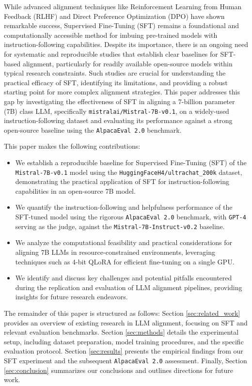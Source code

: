 \documentclass[11pt]{article}
\begin{document}
While advanced alignment techniques like Reinforcement Learning from Human Feedback (RLHF) and Direct Preference Optimization (DPO) have shown remarkable success, Supervised Fine-Tuning (SFT) remains a foundational and computationally accessible method for imbuing pre-trained models with instruction-following capabilities. Despite its importance, there is an ongoing need for systematic and reproducible studies that establish clear baselines for SFT-based alignment, particularly for readily available open-source models within typical research constraints. Such studies are crucial for understanding the practical efficacy of SFT, identifying its limitations, and providing a robust starting point for more complex alignment strategies. This paper addresses this gap by investigating the effectiveness of SFT in aligning a 7-billion parameter (7B) class LLM, specifically \texttt{mistralai/Mistral-7B-v0.1}, on a widely-used instruction-following dataset and evaluating its performance against a strong open-source baseline using the \texttt{AlpacaEval 2.0} benchmark.

This paper makes the following contributions:
\begin{itemize}
    \item We establish a reproducible baseline for Supervised Fine-Tuning (SFT) of the \texttt{Mistral-7B-v0.1} model using the \texttt{HuggingFaceH4/ultrachat\_200k} dataset, demonstrating the practical application of SFT for instruction-following capabilities in an open-source 7B model.
    \item We quantify the instruction-following and helpfulness performance of the SFT-tuned model using the rigorous \texttt{AlpacaEval 2.0} benchmark, with \texttt{GPT-4} serving as the judge, against the \texttt{Mistral-7B-Instruct-v0.2} baseline.
    \item We analyze the computational feasibility and practical considerations for aligning 7B LLMs in resource-constrained environments, leveraging techniques such as 4-bit QLoRA for efficient fine-tuning on a single GPU.
    \item We identify and discuss key challenges and potential pitfalls encountered during the replication and evaluation of LLM alignment pipelines, providing insights for future research endeavors.
\end{itemize}

The remainder of this paper is structured as follows: Section \ref{sec:related_work} provides an overview of existing research in LLM alignment, focusing on SFT and relevant evaluation benchmarks. Section \ref{sec:methods} details the experimental setup, including dataset preparation, model training procedures, and the specific evaluation protocol. Section \ref{sec:results} presents the empirical findings from our SFT experiment and the subsequent \texttt{AlpacaEval 2.0} assessment. Finally, Section \ref{sec:conclusion} summarizes our conclusions and outlines directions for future work.
\end{document}
